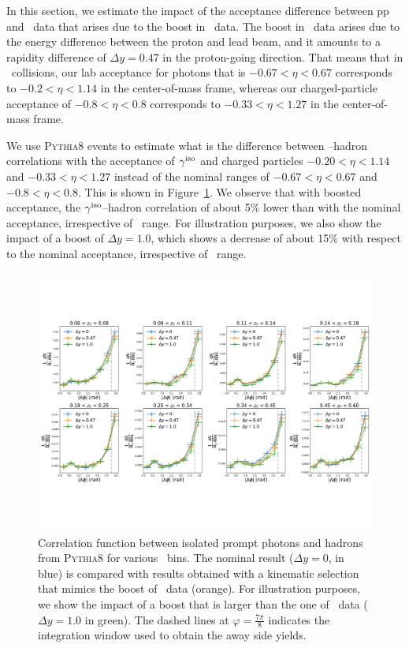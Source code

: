In this section, we estimate the impact of the acceptance difference between pp and \pPb~data that arises due to the boost in \pPb~data. The boost in \pPb~data arises due to the energy difference between the proton and lead beam, and it amounts to a rapidity difference of $\Delta y = 0.47$  in the proton-going direction. That means that in \pPb~collisions, our lab acceptance for photons that is $-0.67<\eta<0.67$ corresponds to $-0.2<\eta<1.14$ in the center-of-mass frame, whereas our charged-particle acceptance of $-0.8<\eta<0.8$ corresponds to $-0.33<\eta<1.27$  in the center-of-mass frame. 

We use \textsc{Pythia8} events to estimate what is the difference between \gammaiso--hadron correlations with the acceptance of $\gamma^\mathrm{iso}$ and charged particles  $-0.20<\eta<1.14$ and $-0.33<\eta<1.27$ instead of the nominal ranges of $-0.67<\eta<0.67$ and $-0.8<\eta<0.8$. This is shown in Figure~\ref{fig:PythiaBoostStudy}. We observe that with boosted acceptance, the $\gamma^\mathrm{iso}$--hadron correlation of about 5$\%$ lower than with the nominal acceptance, irrespective of \zt~range. For illustration purposes, we also show the impact of a boost of $\Delta y =1.0$, which shows a decrease of about 15$\%$  with respect to the nominal acceptance, irrespective of \zt~range. 

\begin{figure}
\centering
\includegraphics[width = 1.0 \textwidth]{PythiaStudyBoost_wLines.pdf}
\caption{Correlation function between isolated prompt photons and hadrons from \textsc{Pythia8} for various \zt~bins. The nominal result ($\Delta y =0$, in blue) is compared with results obtained with a kinematic selection that mimics the boost of \pPb~data (orange). For illustration purposes, we show the impact of a boost that is larger than the one of \pPb~data ($\Delta y = 1.0$ in green). The dashed lines at $\varphi = \frac{7\pi}{8} $ indicates the integration window used to obtain the away side yields.}
\label{fig:PythiaBoostStudy}
\end{figure}

